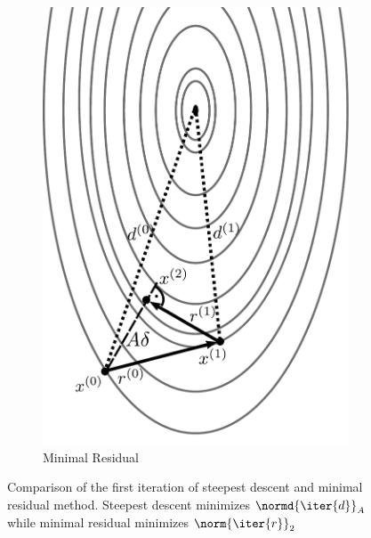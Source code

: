 \begin{figure}
\begin{subfigure}{.5\textwidth}
  \includegraphics[width=0.9\linewidth]{figures/mr.pdf}
  \caption{Minimal Residual}
  \label{fig:mr}
\end{subfigure}
\caption[Steepest Descent vs Minimal Residual]{Comparison of the first iteration of steepest descent and minimal residual method. Steepest descent minimizes $\normd{\iter{d}}_A$ while minimal residual minimizes $\norm{\iter{r}}_2$}
\label{fig:one_d_projections}
\end{figure}


